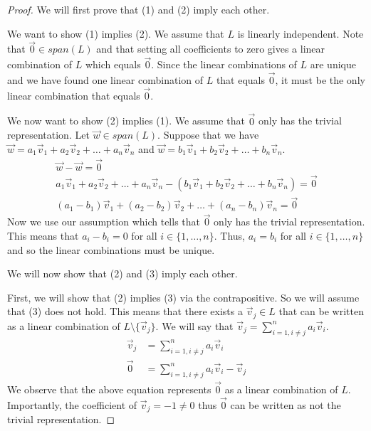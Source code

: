 \begin{proof}
    We will first prove that (1) and (2) imply each other.

    We want to show (1) implies (2). We assume that $L$ is linearly independent. Note that $\vec{0}\in span(L)$ and that setting all coefficients to zero gives a linear combination of $L$ which equals $\vec{0}$. Since the linear combinations of $L$ are unique and we have found one linear combination of $L$ that equals $\vec{0}$, it must be the only linear combination that equals $\vec{0}$.

    We now want to show (2) implies (1). We assume that $\vec{0}$ only has the trivial representation. Let $\vec{w}\in span(L)$. Suppose that we have $\vec{w}=a_1\vec{v}_1+a_2\vec{v}_2+\ldots+a_n\vec{v}_n$ and $\vec{w}=b_1\vec{v}_1+b_2\vec{v}_2+\ldots+b_n\vec{v}_n$.
    \begin{align*}
        \vec{w}-\vec{w}=\vec{0}\\
        a_1\vec{v}_1+a_2\vec{v}_2+\ldots+a_n\vec{v}_n-(b_1\vec{v}_1+b_2\vec{v}_2+\ldots+b_n\vec{v}_n)=\vec{0}\\
        (a_1-b_1)\vec{v}_1+(a_2-b_2)\vec{v}_2+\ldots+(a_n-b_n)\vec{v}_n=\vec{0}
    \end{align*}
    Now we use our assumption which tells that $\vec{0}$ only has the trivial representation. This means that $a_i-b_i=0$ for all $i\in\{1,\ldots, n\}$. Thus, $a_i=b_i$ for all $i\in\{1,\ldots, n\}$ and so the linear combinations must be unique.

    We will now show that (2) and (3) imply each other.

    First, we will show that (2) implies (3) via the contrapositive. So we will assume that (3) does not hold. This means that there exists a $\vec{v}_j\in L$ that can be written as a linear combination of $L\setminus\{\vec{v}_j\}$. We will say that $\vec{v}_j=\sum_{i =1,i\neq j}^n a_i\vec{v}_i$. 
    \begin{align*}
        \vec{v}_j&=\sum_{i =1,i\neq j}^n a_i\vec{v}_i\\
        \vec{0}&=\sum_{i =1,i\neq j}^n a_i\vec{v}_i-\vec{v}_j
    \end{align*}
    We observe that the above equation represents $\vec{0}$ as a linear combination of $L$. Importantly, the coefficient of $\vec{v}_j=-1\neq 0$ thus $\vec{0}$ can be written as not the trivial representation.


\end{proof}
